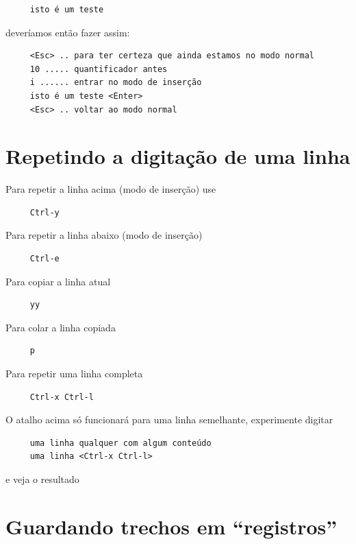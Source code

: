 \documentclass[10pt,a4paper,openany]{book}
\begin{document}
\begin{verbatim}
     isto é um teste
\end{verbatim}

deveríamos então fazer assim:
   
\begin{verbatim}
     <Esc> .. para ter certeza que ainda estamos no modo normal
     10 ..... quantificador antes
     i ...... entrar no modo de inserção
     isto é um teste <Enter>
     <Esc> .. voltar ao modo normal
\end{verbatim}

\section{Repetindo a digitação de uma linha }
Para repetir a linha acima (modo de inserção) use

\begin{verbatim}
     Ctrl-y
\end{verbatim}

Para repetir a linha abaixo (modo de inserção)

\begin{verbatim}
     Ctrl-e
\end{verbatim}

Para copiar a linha atual

\begin{verbatim}
     yy
\end{verbatim}

Para colar a linha copiada

\begin{verbatim}
     p
\end{verbatim}

Para repetir uma linha completa

\begin{verbatim}
     Ctrl-x Ctrl-l
\end{verbatim}

O atalho acima só funcionará para uma linha semelhante, experimente
digitar

\begin{verbatim}
     uma linha qualquer com algum conteúdo
     uma linha <Ctrl-x Ctrl-l>
\end{verbatim}

e veja o resultado

\section{Guardando trechos em ``registros''}
\label{sec:Guardando trechos em ``registros''}
\end{document}

